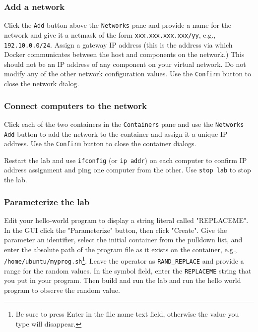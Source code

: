 \documentclass[12pt]{article}
\begin{document}
\subsubsection{Add a network}
Click the {\tt Add} button above the {\tt Networks} pane and provide a name for the network and give it a
netmask of the form {\tt xxx.xxx.xxx.xxx/yy}, e.g., {\tt 192.10.0.0/24}.  Assign a gateway IP address (this is
the address via which Docker communicates between the host and components on the network.)  This should not
be an IP address of any component on your virtual network.  Do not modify any of the other network configuration
values.  Use the {\tt Confirm} button to close the network dialog.

\subsubsection{Connect computers to the network}
Click each of the two containers in the {\tt Containers} pane and use the {\tt Networks} {\tt Add} button to 
add the network to the container and assign it a unique IP address.  Use the {\tt Confirm} button to close the
container dialogs.

Restart the lab and use {\tt ifconfig} (or {\tt ip addr}) on each computer to confirm IP address assignment and ping one computer from
the other.   Use {\tt stop lab} to stop the lab.

\subsubsection{Parameterize the lab}
Edit your hello-world program to display a string literal called "REPLACEME".  
In the GUI click the "Parameterize" button, then click "Create".  Give the parameter an identifier, select the initial
container from the pulldown list, and enter the absolute path of the program file as it exists on the container, e.g.,
{\tt /home/ubuntu/myprog.sh}\footnote{Be sure to press Enter in the file name text field, otherwise the value you type will disappear.}.  Leave the operator as {\tt RAND\_REPLACE} and provide a range for the random values.
In the symbol field, enter the {\tt REPLACEME} string that you put in your program. 
Then build and run the lab and run the hello world program to observe the random value.  
\end{document}
